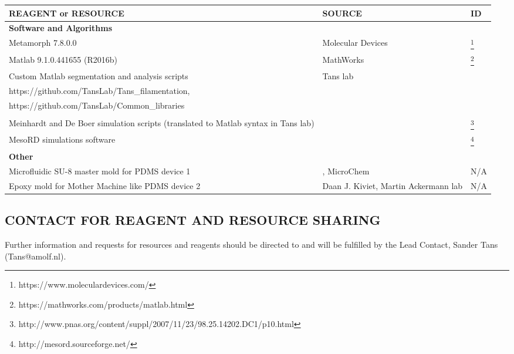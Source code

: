 \noindent 
\begin{minipage}[t]{\linewidth}
    \centering
    \begin{tabular}[center]{p{} p{} p{}}
        REAGENT or RESOURCE	&	SOURCE	&	ID	\\ \hline
\textbf{Software and Algorithms}	&		&		\\ \hline
Metamorph 7.8.0.0	&	Molecular Devices	&	\footnote{https://www.moleculardevices.com/}	\\ \hline
Matlab 9.1.0.441655 (R2016b)	&	MathWorks	&	\footnote{https://mathworks.com/products/matlab.html}	\\ \hline
Custom Matlab segmentation and analysis scripts	&	Tans lab	&	\footnote{https://github.com/TansLab/Tans\_Schnitzcells,\\ https://github.com/TansLab/Tans\_filamentation,\\ https://github.com/TansLab/Common\_libraries}	\\ \hline
&		&		\\ \hline
Meinhardt and De Boer simulation scripts (translated to Matlab syntax in Tans lab)	&	\cite{Meinhardt2001}	&	\footnote{http://www.pnas.org/content/suppl/2007/11/23/98.25.14202.DC1/p10.html}	\\ \hline
MesoRD simulations software	&	\cite{Fange2006}	&	\footnote{http://mesord.sourceforge.net/}	\\ \hline
\textbf{Other}	&		&		\\ \hline
Microfluidic SU-8 master mold for PDMS device 1	&	\cite{Boulineau2013}, MicroChem	&	N/A	\\ \hline
Epoxy mold for Mother Machine like PDMS device 2	&	Daan J. Kiviet, Martin Ackermann lab	&	N/A	\\ \hline
    \end{tabular}
\end{minipage}

\subsection{CONTACT FOR REAGENT AND RESOURCE SHARING}
Further information and requests for resources and reagents should be directed to and will be fulfilled by the Lead Contact, Sander Tans (Tans@amolf.nl).

